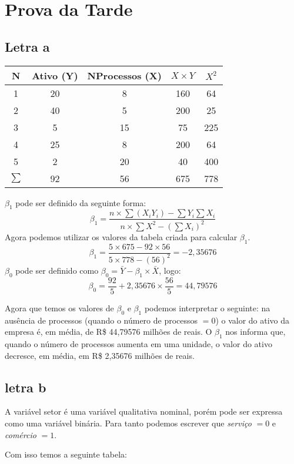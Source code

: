 \chapter{Prova da Tarde}
\section{Letra a}
\begin{center}
    \begin{tabular}{|c|c|c|c|c|}
        \hline
        N & Ativo (Y) & NProcessos (X) & \(X \times Y\) & \(X^2\)  \\ \hline
        1 & 20 & 8 & 160 & 64 \\ \hline
        2 & 40 & 5 & 200 & 25 \\ \hline
        3 & 5 & 15 & 75 & 225 \\ \hline
        4 & 25 & 8 & 200 & 64 \\ \hline
        5 & 2 & 20 & 40 & 400 \\ \hline
        \(\sum\) & 92 & 56 & 675 & 778 \\ \hline
    \end{tabular}
\end{center}
\(\beta_{1}\) pode ser definido da seguinte forma:
\[\beta_{1} = \frac{n \times \sum (X_{i}Y_{i}) - \sum Y_{i}\sum X_{i}}{n \times \sum X^2 - (\sum X_{i})^2}\]
Agora podemos utilizar os valores da tabela criada para calcular \(\beta_{1}\).
\[ \beta_{1} = \frac{5 \times 675 - 92 \times 56}{5 \times 778 - (56)^2} = -2,35676 \]
\(\beta_{0}\) pode ser definido como \(\beta_{0} = \bar{Y} - \beta_{1} \times \bar{X}\), logo:
\[ \beta_{0} = \frac{92}{5} + 2,35676 \times \frac{56}{5} = 44,79576 \]

Agora que temos os valores de \(\beta_{0}\) e \(\beta_{1}\) podemos interpretar o seguinte: na ausência de processos (quando o número de processos \(= 0\)) o valor do ativo da empresa é, em média, de R\$ 44,79576 milhões de reais. O \(\beta_{1}\) nos informa que, quando o número de processos aumenta em uma unidade, o valor do ativo decresce, em média, em R\$ 2,35676 milhões de reais.

\section{letra b}
A variável setor é uma variável qualitativa nominal, porém pode ser expressa como uma variável binária. Para tanto podemos escrever que \textit{serviço} \(= 0\) e \textit{comércio} \(= 1\).

Com isso temos a seguinte tabela:


